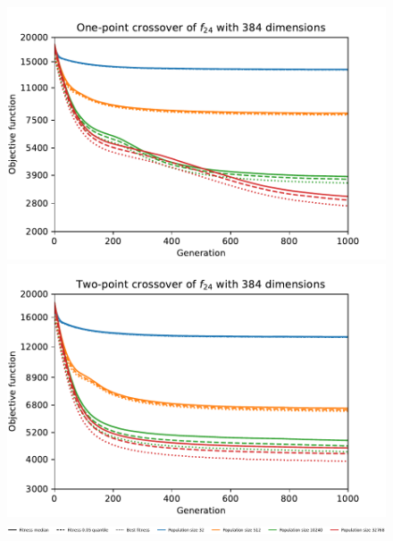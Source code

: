 \begin{figure}[ht!]
\begin{minipage}[t]{0.32\textwidth}
    \end{minipage}
    \\
    \centering
    \begin{minipage}[t]{0.32\textwidth}
        \includegraphics[width=\textwidth]{img/runs/fitness_es_crossover_f24_dim384_OnePoint1D.pdf}
    \end{minipage}
    \begin{minipage}[t]{0.32\textwidth}
        \centering
        \includegraphics[width=\textwidth]{img/runs/fitness_es_crossover_f24_dim384_TwoPoint1D.pdf}
    \end{minipage}

    \begin{minipage}{\textwidth}
        \centering
        \includegraphics[width=\textwidth]{img/runs/fitness_es_crossovers_legend.pdf}
    \end{minipage}


\end{figure}
